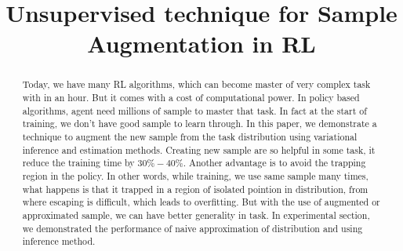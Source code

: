 \documentclass[conference]{IEEEtran}
\begin{document}
\title{Unsupervised technique for Sample Augmentation in RL }

\iffalse
\author{\IEEEauthorblockN{Author}
\and
\IEEEauthorblockN{Author}
\and
\IEEEauthorblockN{Author}
\and
\IEEEauthorblockN{Author}}
\fi



% 
\author{
}








\maketitle

\begin{abstract}
Today, we have many RL algorithms, which can become master of very complex task with in an hour. But it comes with a cost of computational power. In policy based algorithms, agent need millions of sample to master that task. In fact at the start of training, we don't have good sample to learn through. In this paper, we demonstrate a technique to augment the new sample from the task distribution using variational inference and estimation methods. Creating new sample are so helpful in some task, it reduce the training time by $30\% - 40\%$. Another advantage is to avoid the trapping region in the policy. In other words, while training, we use same sample many times, what happens is that it trapped in a region of isolated pointion in distribution, from where escaping is difficult, which leads to overfitting. But with the use of augmented or approximated sample, we can have better generality in task. In experimental section, we demonstrated the performance of naive approximation of distribution and using inference method.
\end{abstract}
\end{document}
